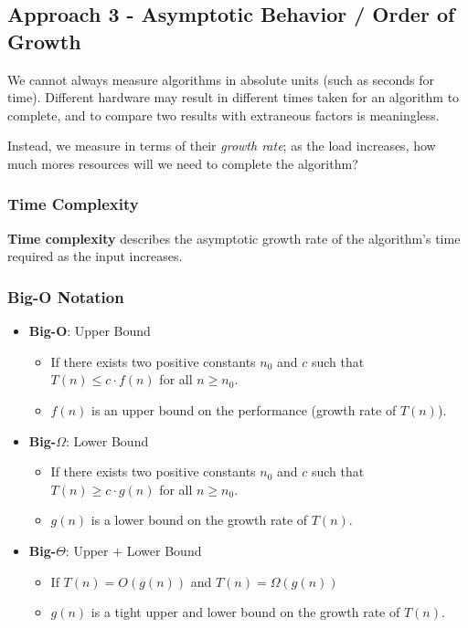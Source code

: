 \documentclass[12pt, letterpaper]{article}
\begin{document}
\subsection*{Approach 3 - Asymptotic Behavior / Order of Growth}

We cannot always measure algorithms in absolute units (such as seconds for time). Different hardware may result in different times taken for an algorithm to complete, and to compare two results with extraneous factors is meaningless.

Instead, we measure in terms of their \textit{growth rate}; as the load increases, how much mores resources will we need to complete the algorithm?

\subsubsection*{Time Complexity}

\textbf{Time complexity} describes the asymptotic growth rate of the algorithm's time required as the input increases.

\subsubsection*{Big-O Notation}
\begin{itemize}
    \item \textbf{Big-O}: Upper Bound
        \begin{itemize}
            \item If there exists two positive constants $ n_0$ and $ c $ such that $ T(n) \leq c \cdot f(n) $ for all $ n \geq n_0 $.
            \item $ f(n) $ is an upper bound on the performance (growth rate of $ T(n) $).
        \end{itemize}
    \item \textbf{Big-$\Omega$}: Lower Bound
        \begin{itemize}
            \item If there exists two positive constants $ n_0$ and $ c $ such that $ T(n) \geq c \cdot g(n) $ for all $ n \geq n_0 $.
            \item $ g(n) $ is a lower bound on the growth rate of $ T(n) $.
        \end{itemize}
    \item \textbf{Big-$\Theta$}: Upper + Lower Bound
        \begin{itemize}
            \item If $ T(n) = O(g(n)) $ and $ T(n) = \Omega(g(n)) $
            \item $ g(n) $ is a tight upper and lower bound on the growth rate of $ T(n) $.
        \end{itemize}
\end{itemize}
\end{document}
